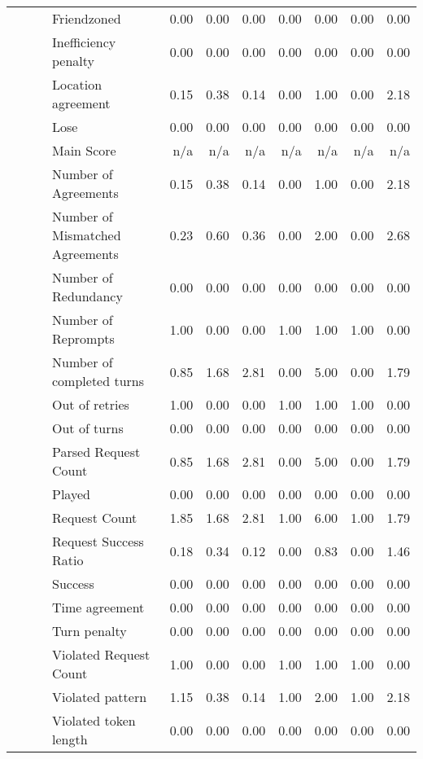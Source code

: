 \begin{tabular}{llllrrrrrrr}
 &  &  & Friendzoned & 0.00 & 0.00 & 0.00 & 0.00 & 0.00 & 0.00 & 0.00 \\
 &  &  & Inefficiency penalty & 0.00 & 0.00 & 0.00 & 0.00 & 0.00 & 0.00 & 0.00 \\
 &  &  & Location agreement & 0.15 & 0.38 & 0.14 & 0.00 & 1.00 & 0.00 & 2.18 \\
 &  &  & Lose & 0.00 & 0.00 & 0.00 & 0.00 & 0.00 & 0.00 & 0.00 \\
 &  &  & Main Score & n/a & n/a & n/a & n/a & n/a & n/a & n/a \\
 &  &  & Number of Agreements & 0.15 & 0.38 & 0.14 & 0.00 & 1.00 & 0.00 & 2.18 \\
 &  &  & Number of Mismatched Agreements & 0.23 & 0.60 & 0.36 & 0.00 & 2.00 & 0.00 & 2.68 \\
 &  &  & Number of Redundancy & 0.00 & 0.00 & 0.00 & 0.00 & 0.00 & 0.00 & 0.00 \\
 &  &  & Number of Reprompts & 1.00 & 0.00 & 0.00 & 1.00 & 1.00 & 1.00 & 0.00 \\
 &  &  & Number of completed turns & 0.85 & 1.68 & 2.81 & 0.00 & 5.00 & 0.00 & 1.79 \\
 &  &  & Out of retries & 1.00 & 0.00 & 0.00 & 1.00 & 1.00 & 1.00 & 0.00 \\
 &  &  & Out of turns & 0.00 & 0.00 & 0.00 & 0.00 & 0.00 & 0.00 & 0.00 \\
 &  &  & Parsed Request Count & 0.85 & 1.68 & 2.81 & 0.00 & 5.00 & 0.00 & 1.79 \\
 &  &  & Played & 0.00 & 0.00 & 0.00 & 0.00 & 0.00 & 0.00 & 0.00 \\
 &  &  & Request Count & 1.85 & 1.68 & 2.81 & 1.00 & 6.00 & 1.00 & 1.79 \\
 &  &  & Request Success Ratio & 0.18 & 0.34 & 0.12 & 0.00 & 0.83 & 0.00 & 1.46 \\
 &  &  & Success & 0.00 & 0.00 & 0.00 & 0.00 & 0.00 & 0.00 & 0.00 \\
 &  &  & Time agreement & 0.00 & 0.00 & 0.00 & 0.00 & 0.00 & 0.00 & 0.00 \\
 &  &  & Turn penalty & 0.00 & 0.00 & 0.00 & 0.00 & 0.00 & 0.00 & 0.00 \\
 &  &  & Violated Request Count & 1.00 & 0.00 & 0.00 & 1.00 & 1.00 & 1.00 & 0.00 \\
 &  &  & Violated pattern & 1.15 & 0.38 & 0.14 & 1.00 & 2.00 & 1.00 & 2.18 \\
 &  &  & Violated token length & 0.00 & 0.00 & 0.00 & 0.00 & 0.00 & 0.00 & 0.00 \\
\cline{3-11}

\end{tabular}
